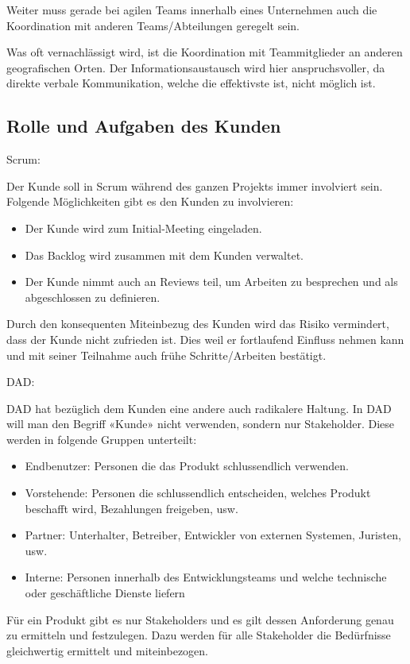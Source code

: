 Weiter muss gerade bei agilen Teams innerhalb eines Unternehmen auch die Koordination mit anderen Teams/Abteilungen geregelt sein.
\medskip

Was oft vernachlässigt wird, ist die Koordination mit Teammitglieder an anderen geografischen Orten. Der Informationsaustausch wird hier anspruchsvoller, da direkte verbale Kommunikation, welche die effektivste ist, nicht möglich ist.


\subsection{Rolle und Aufgaben des Kunden}

{\Large Scrum:} \cite{planningPrioScrum} \medskip

Der Kunde soll in Scrum während des ganzen Projekts immer involviert sein. Folgende Möglichkeiten gibt es den Kunden zu involvieren:
\begin{itemize}
	\item Der Kunde wird zum Initial-Meeting eingeladen.
	\item Das Backlog wird zusammen mit dem Kunden verwaltet.
	\item Der Kunde nimmt auch an Reviews teil, um Arbeiten zu besprechen und als abgeschlossen zu definieren.
\end{itemize}
Durch den konsequenten Miteinbezug des Kunden wird das Risiko vermindert, dass der Kunde nicht zufrieden ist. Dies weil er fortlaufend Einfluss nehmen kann und mit seiner Teilnahme auch frühe Schritte/Arbeiten bestätigt.
\bigskip 

{\Large DAD:} \cite{planningPrioDad} \medskip

DAD hat bezüglich dem Kunden eine andere auch radikalere Haltung. In DAD will man den Begriff «Kunde» nicht verwenden, sondern nur Stakeholder. Diese werden in folgende Gruppen unterteilt:
\begin{itemize}
	\item Endbenutzer: Personen die das Produkt schlussendlich verwenden.
	\item Vorstehende: Personen die schlussendlich entscheiden, welches Produkt beschafft wird, Bezahlungen freigeben, usw.
	\item Partner: Unterhalter, Betreiber, Entwickler von externen Systemen, Juristen, usw.
	\item Interne: Personen innerhalb des Entwicklungsteams und welche technische oder geschäftliche Dienste liefern
\end{itemize}
Für ein Produkt gibt es nur Stakeholders und es gilt dessen Anforderung genau zu ermitteln und festzulegen. Dazu werden für alle Stakeholder die Bedürfnisse gleichwertig ermittelt und miteinbezogen. \smallskip

